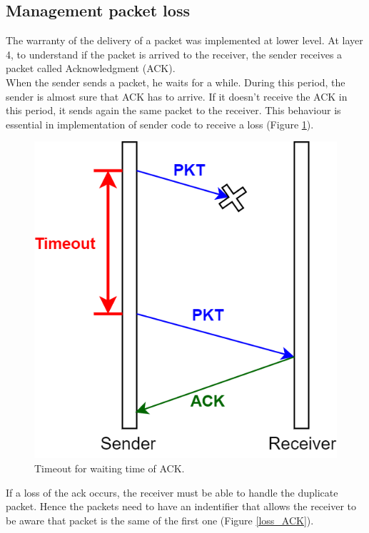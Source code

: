 \subsection{Management packet loss}
The warranty of the delivery of a packet was implemented at lower level. At layer 4, to understand if the packet is arrived to the receiver, the sender receives a packet called Acknowledgment (ACK).\\
When the sender sends a packet, he waits for a while. During this period, the sender is almost sure that ACK has to arrive. If it doesn't receive the ACK in this period, it sends again the same packet to the receiver. This behaviour is essential in implementation of sender code to receive a loss (Figure \ref{timeout}).\\

\begin{figure}[H]
\centering\footnotesize
\includegraphics[scale=0.4]{Images/Transport/timeout}
\caption{Timeout for waiting time of ACK.}\label{timeout}
\end{figure}

If a loss of the ack occurs, the receiver must be able to handle the duplicate packet. Hence the packets need to have an indentifier that allows the receiver to  be aware that packet is the same of the first one (Figure \ref{loss_ACK}).\\

